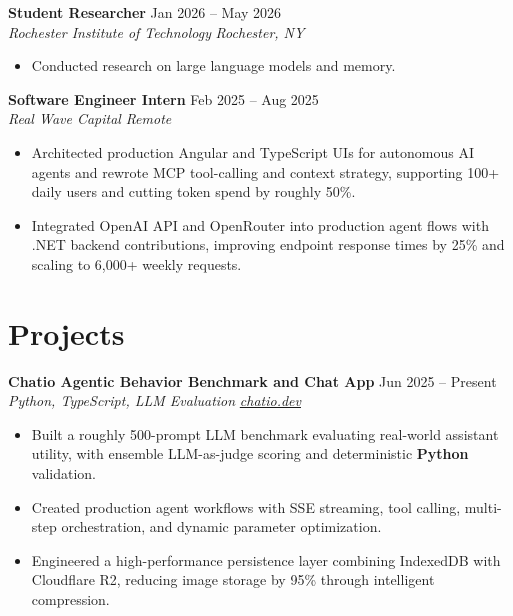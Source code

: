 \documentclass[10pt,letterpaper]{article}
\newif\ifresumeFirstRole
\newcommand{\resumeRole}[4]{%
  \ifresumeFirstRole
    \global\resumeFirstRolefalse
  \else
    \vspace{0pt plus 1fill}%
  \fi
  \textbf{#1} \hfill #2\\
  \textit{#3} \hfill \textit{#4}
}
\begin{document}
\resumeRole{Student Researcher}{Jan 2026 -- May 2026}{Rochester Institute of Technology}{Rochester, NY}
\begin{itemize}
  \item Conducted research on large language models and memory.
\end{itemize}

\resumeRole{Software Engineer Intern}{Feb 2025 -- Aug 2025}{Real Wave Capital}{Remote}
\begin{itemize}
  \item Architected production Angular and TypeScript UIs for autonomous AI agents and rewrote MCP tool-calling and context strategy, supporting 100+ daily users and cutting token spend by roughly 50\%.
  \item Integrated OpenAI API and OpenRouter into production agent flows with .NET backend contributions, improving endpoint response times by 25\% and scaling to 6,000+ weekly requests.
\end{itemize}

\section*{Projects}
\resumeRole{Chatio Agentic Behavior Benchmark and Chat App}{Jun 2025 -- Present}{Python, TypeScript, LLM Evaluation}{\href{https://chatio.dev}{chatio.dev}}
\begin{itemize}
  \item Built a roughly 500-prompt LLM benchmark evaluating real-world assistant utility, with ensemble LLM-as-judge scoring and deterministic \textbf{Python} validation.
  \item Created production agent workflows with SSE streaming, tool calling, multi-step orchestration, and dynamic parameter optimization.
  \item Engineered a high-performance persistence layer combining IndexedDB with Cloudflare R2, reducing image storage by 95\% through intelligent compression.
\end{itemize}
\end{document}
